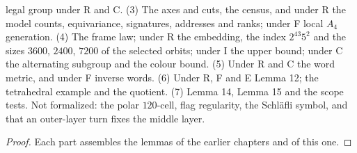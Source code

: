 \begin{theorem}
  legal group under R and C. (3) The axes and cuts, the census, and under
  R the model counts, equivariance, signatures, addresses and ranks; under
  F local \(A_4\) generation. (4) The frame law; under R the embedding,
  the index \(2^{43}5^2\) and the sizes \(3600\), \(2400\), \(7200\) of the
  selected orbits; under I the upper bound; under C the alternating
  subgroup and the colour bound. (5) Under R and C the word metric, and
  under F inverse words. (6) Under R, F and E Lemma 12; the tetrahedral
  example and the quotient. (7) Lemma 14, Lemma 15 and the scope tests.
  Not formalized: the polar \(120\)-cell, flag regularity, the Schl\"afli
  symbol, and that an outer-layer turn fixes the middle layer.
\end{theorem}
\begin{proof}
  \leanok
  Each part assembles the lemmas of the earlier chapters and of this one.
\end{proof}

